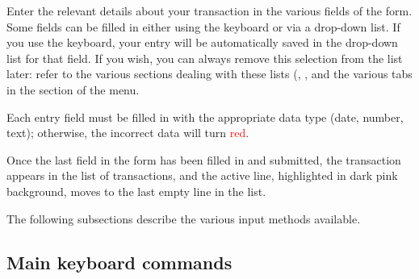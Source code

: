 Enter the relevant details about your transaction in the various fields of the form. Some fields can be filled in either using the keyboard or via a drop-down list. If you use the keyboard, your entry will be automatically saved in the drop-down list for that field. If you wish, you can always remove this selection from the list later: refer to the various sections dealing with these lists (, ,  and the various tabs in the  section of the  menu.

Each entry field must be filled in with the appropriate data type (date, number, text); otherwise, the incorrect data will turn \textcolor{red}{red}.

Once the last field in the form has been filled in and submitted, the transaction appears in the list of transactions, and the active line, highlighted in \colorbox[RGB]{245,155,155}{dark pink background}, moves to the last empty line in the list.

The following subsections describe the various input methods available.


\subsection{Main keyboard commands\label{transactions-new-keyboard}}

